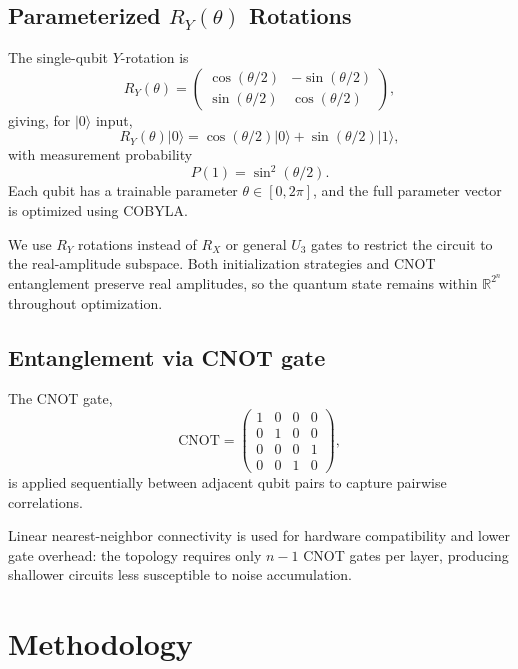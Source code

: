 \documentclass[runningheads]{llncs}
\begin{document}
\subsection{Parameterized $R_Y(\theta)$ Rotations}
The single-qubit $Y$-rotation is
\begin{equation}
    R_Y(\theta) = \begin{pmatrix} 
        \cos(\theta/2) & -\sin(\theta/2) \\ 
        \sin(\theta/2) &  \cos(\theta/2) 
    \end{pmatrix},
\end{equation}
giving, for $|0\rangle$ input,
\begin{equation}
    R_Y(\theta)|0\rangle = \cos(\theta/2)|0\rangle 
    + \sin(\theta/2)|1\rangle,
\end{equation}
with measurement probability
\begin{equation}
    P(1) = \sin^2(\theta/2).
\end{equation}
Each qubit has a trainable parameter $\theta\in[0,2\pi]$, and the full parameter vector is optimized using COBYLA.

We use $R_Y$ rotations instead of $R_X$ or general $U_3$ gates to restrict the circuit to the real-amplitude subspace. Both initialization strategies and CNOT entanglement preserve real amplitudes, so the quantum state remains within $\mathbb{R}^{2^n}$ throughout optimization.

\subsection{Entanglement via CNOT gate}
The CNOT gate,
\begin{equation}
    \text{CNOT} = \begin{pmatrix} 
        1 & 0 & 0 & 0 \\ 
        0 & 1 & 0 & 0 \\ 
        0 & 0 & 0 & 1 \\ 
        0 & 0 & 1 & 0 
    \end{pmatrix},
\end{equation}
is applied sequentially between adjacent qubit pairs to capture pairwise correlations.

Linear nearest-neighbor connectivity is used for hardware compatibility and lower gate overhead: the topology requires only $n-1$ CNOT gates per layer, producing shallower circuits less susceptible to noise accumulation.
\section{Methodology}
\end{document}
